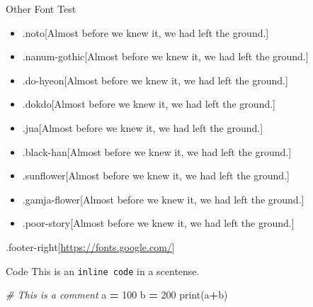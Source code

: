 \documentclass[
  ignorenonframetext,
]{beamer}
\newenvironment{Shaded}{\begin{snugshade}}{\end{snugshade}}
\newcommand{\BuiltInTok}[1]{#1}
\newcommand{\CommentTok}[1]{\textcolor[rgb]{0.56,0.35,0.01}{\textit{#1}}}
\newcommand{\DecValTok}[1]{\textcolor[rgb]{0.00,0.00,0.81}{#1}}
\newcommand{\NormalTok}[1]{#1}
\newcommand{\OperatorTok}[1]{\textcolor[rgb]{0.81,0.36,0.00}{\textbf{#1}}}
\providecommand{\tightlist}{%
  \setlength{\itemsep}{0pt}\setlength{\parskip}{0pt}}
\begin{document}
\begin{frame}{Other Font Test}
\protect\hypertarget{other-font-test}{}
\begin{itemize}
\tightlist
\item
  .noto{[}Almost before we knew it, we had left the ground.{]}
\item
  .nanum-gothic{[}Almost before we knew it, we had left the ground.{]}
\item
  .do-hyeon{[}Almost before we knew it, we had left the ground.{]}
\item
  .dokdo{[}Almost before we knew it, we had left the ground.{]}
\item
  .jua{[}Almost before we knew it, we had left the ground.{]}
\item
  .black-han{[}Almost before we knew it, we had left the ground.{]}
\item
  .sunflower{[}Almost before we knew it, we had left the ground.{]}
\item
  .gamja-flower{[}Almost before we knew it, we had left the ground.{]}
\item
  .poor-story{[}Almost before we knew it, we had left the ground.{]}
\end{itemize}

.footer-right{[}\url{https://fonts.google.com/}{]}
\end{frame}

\begin{frame}[fragile]{Code}
\protect\hypertarget{code}{}
This is an \texttt{inline\ code} in a scentense.

\begin{Shaded}
\begin{Highlighting}[]
\CommentTok{\# This is a comment}
\NormalTok{a }\OperatorTok{=} \DecValTok{100}
\NormalTok{b }\OperatorTok{=} \DecValTok{200}
\BuiltInTok{print}\NormalTok{(a}\OperatorTok{+}\NormalTok{b)}
\end{Highlighting}
\end{Shaded}
\end{frame}
\end{document}

